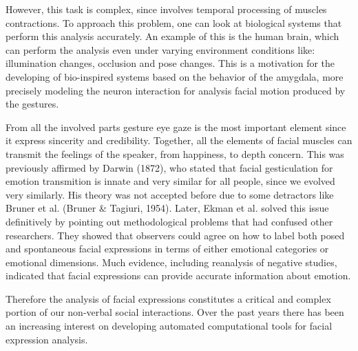 However, this task is complex, since involves temporal processing of muscles contractions. To approach this problem, one can look at biological systems that perform this analysis accurately. An example of this is the human brain, which can perform the analysis even under varying environment conditions like: illumination changes, occlusion and pose changes. This is a motivation for the developing of bio-inspired systems based on the behavior of the amygdala, more precisely modeling the neuron interaction for analysis facial motion produced by the gestures.

From all the involved parts gesture eye gaze is the most important element since it express sincerity and credibility. Together, all the elements of facial muscles can transmit the feelings of the speaker, from happiness, to depth concern. This was previously affirmed by Darwin (1872), who stated that facial gesticulation for emotion transmition is innate and very similar for all people, since we evolved very similarly. His theory was not accepted before due to some detractors like Bruner et al. (Bruner \& Tagiuri, 1954). Later, Ekman et al. \cite{Hager1979} solved this issue definitively by pointing out methodological problems that had confused other researchers. They showed that observers could agree on how to label both posed and spontaneous facial expressions in terms of either emotional categories or emotional dimensions. Much evidence, including reanalysis of negative studies, indicated that facial expressions can provide accurate information about emotion.

Therefore the analysis of facial expressions constitutes a critical and complex portion of our non-verbal social interactions. Over the past years there has been an increasing interest on developing automated computational tools for facial expression analysis.

